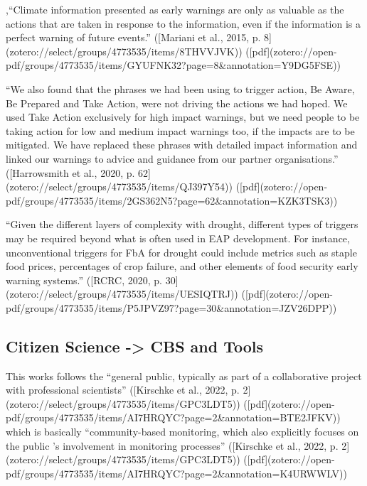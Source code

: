 ,“Climate information presented as early warnings are only as valuable as the actions that are taken in response to the information, even if the information is a perfect warning of future events.” ([Mariani et al., 2015, p. 8](zotero://select/groups/4773535/items/8THVVJVK)) ([pdf](zotero://open-pdf/groups/4773535/items/GYUFNK32?page=8&annotation=Y9DG5FSE))




“We also found that the phrases we had been using to trigger action, Be Aware, Be Prepared and Take Action, were not driving the actions we had hoped. We used Take Action exclusively for high impact warnings, but we need people to be taking action for low and medium impact warnings too, if the impacts are to be mitigated. We have replaced these phrases with detailed impact information and linked our warnings to advice and guidance from our partner organisations.” ([Harrowsmith et al., 2020, p. 62](zotero://select/groups/4773535/items/QJ397Y54)) ([pdf](zotero://open-pdf/groups/4773535/items/2GS362N5?page=62&annotation=KZK3TSK3))


“Given the different layers of complexity with drought, different types of triggers may be required beyond what is often used in EAP development. For instance, unconventional triggers for FbA for drought could include metrics such as staple food prices, percentages of crop failure, and other elements of food security early warning systems.” ([RCRC, 2020, p. 30](zotero://select/groups/4773535/items/UESIQTRJ)) ([pdf](zotero://open-pdf/groups/4773535/items/P5JPVZ97?page=30&annotation=JZV26DPP))



\subsection{Citizen Science -> CBS and Tools}
This works follows the “general public, typically as part of a collaborative project with professional scientists” ([Kirschke et al., 2022, p. 2](zotero://select/groups/4773535/items/GPC3LDT5)) ([pdf](zotero://open-pdf/groups/4773535/items/AI7HRQYC?page=2&annotation=BTE2JFKV)) which is basically “community-based monitoring, which also explicitly focuses on the public ’s involvement in monitoring processes” ([Kirschke et al., 2022, p. 2](zotero://select/groups/4773535/items/GPC3LDT5)) ([pdf](zotero://open-pdf/groups/4773535/items/AI7HRQYC?page=2&annotation=K4URWWLV))

